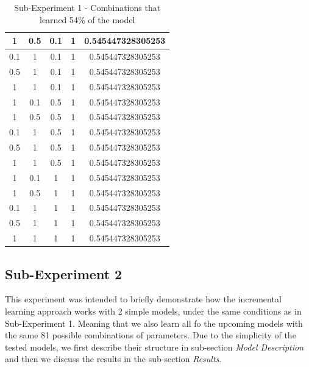 \begin{table}[htbp]
{\begin{minipage}{\textwidth}
\begin{tabular}{||c c c c c||}
				\hline
				1 & 0.5 & 0.1 & 1 & 0.545447328305253 \\ 
				\hline
				0.1 & 1 & 0.1 & 1 & 0.545447328305253 \\ 
				\hline
				0.5 & 1 & 0.1 & 1 & 0.545447328305253 \\ 
				\hline
				1 & 1 & 0.1 & 1 & 0.545447328305253 \\ 
				\hline
				1 & 0.1 & 0.5 & 1 & 0.545447328305253 \\ 
				\hline
				1 & 0.5 & 0.5 & 1 & 0.545447328305253 \\ 
				\hline
				0.1 & 1 & 0.5 & 1 & 0.545447328305253 \\ 
				\hline
				0.5 & 1 & 0.5 & 1 & 0.545447328305253 \\ 
				\hline
				1 & 1 & 0.5 & 1 & 0.545447328305253 \\ 
				\hline
				1 & 0.1 & 1 & 1 & 0.545447328305253 \\
				\hline
				1 & 0.5 & 1 & 1 & 0.545447328305253 \\ 
				\hline
				0.1 & 1 & 1 & 1 & 0.545447328305253 \\ 
				\hline
				0.5 & 1 & 1 & 1 & 0.545447328305253 \\ 
				\hline
				1 & 1 & 1 & 1 & 0.545447328305253 \\  [1ex] 
				\hline
			\end{tabular}
	\end{minipage}}
	\caption{Sub-Experiment 1 - Combinations that learned 54\% of the model}
\label{table:combination_3}
\end{table}

\newpage

\subsection{Sub-Experiment 2}
This experiment was intended to briefly demonstrate how the incremental learning approach works with 2 simple models, under the same conditions as in Sub-Experiment 1. Meaning that we also learn all fo the upcoming models with the same 81 possible combinations of parameters. Due to the simplicity of the tested models, we first describe their structure in sub-section \textit{Model Description} and then we discuss the results in the sub-section \textit{Results}. 

